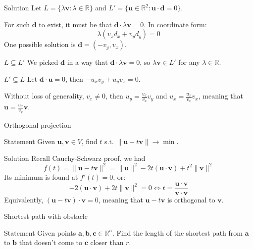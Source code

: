\documentclass[10pt]{beamer}
\begin{document}
\begin{frame}{Solution}
    Let $L = \{\lambda \mathbf v : \lambda \in \mathbb R\}$ and $L' = \{\mathbf u \in \mathbb R^2 : \mathbf u \cdot \mathbf d = 0\}$.
    
    For such $\mathbf d$ to exist, it must be that $\mathbf d \cdot \lambda \mathbf v = 0$. In coordinate form:
    $$
    \lambda(v_x d_x + v_y d_y) = 0
    $$
    One possible solution is $\mathbf d =(-v_y, v_x)$.

    \begin{block}{$L \subseteq L'$}
        We picked $\mathbf d$ in a way that $\mathbf d \cdot \lambda \mathbf v =0$, so $\lambda \mathbf v \in L'$ for any $\lambda \in \mathbb R$.
    \end{block}
    \begin{block}{$L' \subseteq L$}
        Let $\mathbf d \cdot \mathbf u = 0$, then $-u_x v_y + u_y v_x = 0$.
        
        Without loss of generality, $v_x \neq 0$, then $u_y = \frac{u_x}{v_x} v_y$ and $u_x = \frac{u_x}{v_x} v_x$, meaning that $\mathbf u = \frac{u_x}{v_x} \mathbf v$.
    \end{block}
\end{frame}

\begin{frame}{Orthogonal projection}
    \begin{center}
        
    \end{center}
    \begin{block}{Statement}
        Given $\mathbf u, \mathbf v \in V$, find $t$ s.t. $\|\mathbf u - t \mathbf v\| \to \min$.
    \end{block}
\end{frame}

\begin{frame}{Solution}
    Recall Cauchy-Schwarz proof, we had
    $$
    f(t) = \|\mathbf u - t\mathbf v\|^2 = \|\mathbf u\|^2 -2t(\mathbf u \cdot \mathbf v) + t^2 \|\mathbf v\|^2
    $$
    Its minimum is found at $f'(t)=0$, or:
    $$
    -2 (\mathbf u \cdot \mathbf v) + 2t \|\mathbf v\|^2 = 0 \iff \boxed{t = \frac{\mathbf u \cdot \mathbf v}{\mathbf v \cdot \mathbf v}}
    $$
    Equivalently, $(\mathbf u - t \mathbf v) \cdot \mathbf v = 0$, meaning that $\mathbf u - t \mathbf v$ is orthogonal to $\mathbf v$.
\end{frame}

\begin{frame}{Shortest path with obstacle}
    \begin{block}{Statement}
        Given points $\mathbf a, \mathbf b, \mathbf c \in \mathbb R^n$. Find the length of the shortest path from $\mathbf a$ to $\mathbf b$ that doesn't come to $\mathbf c$ closer than $r$.
    \end{block}
\end{frame}
\end{document}
